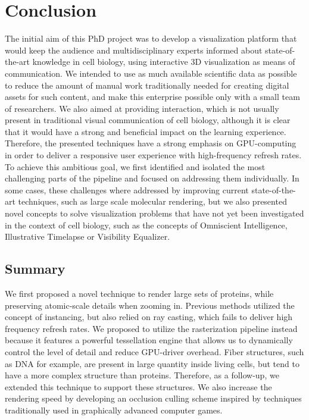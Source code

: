\chapter{Conclusion}
\label{sec:section5}

The initial aim of this PhD project was to develop a visualization platform that would keep the audience and multidisciplinary experts informed about state-of-the-art knowledge in cell biology, using interactive 3D visualization as means of communication.
We intended to use as much available scientific data as possible to reduce the amount of manual work traditionally needed for creating digital assets for such content, and make this enterprise possible only with a small team of researchers.
We also aimed at providing interaction, which is not usually present in traditional visual communication of cell biology, although it is clear that it would have a strong and beneficial impact on the learning experience.
Therefore, the presented techniques have a strong emphasis on GPU-computing in order to deliver a responsive user experience with high-frequency refresh rates. 
To achieve this ambitious goal, we first identified and isolated the most challenging parts of the pipeline and focused on addressing them individually.
In some cases, these challenges where addressed by improving current state-of-the-art techniques, such as large scale molecular rendering, but we also presented novel concepts to solve visualization problems that have not yet been investigated in the context of cell biology, such as the concepts of Omniscient Intelligence, Illustrative Timelapse or Visibility Equalizer.  

\section{Summary}

We first proposed a novel technique to render large sets of proteins, while preserving atomic-scale details when zooming in.
Previous methods utilized the concept of instancing, but also relied on ray casting, which fails to deliver high frequency refresh rates. 
We proposed to utilize the rasterization pipeline instead because it features a powerful tessellation engine that allows us to dynamically control the level of detail and reduce GPU-driver overhead. 
Fiber structures, such as DNA for example, are present in large quantity inside living cells, but tend to have a more complex structure than proteins. 
Therefore, as a follow-up, we extended this technique to support these structures.
We also increase the rendering speed by developing an occlusion culling scheme inspired by techniques traditionally used in graphically advanced computer games. 

